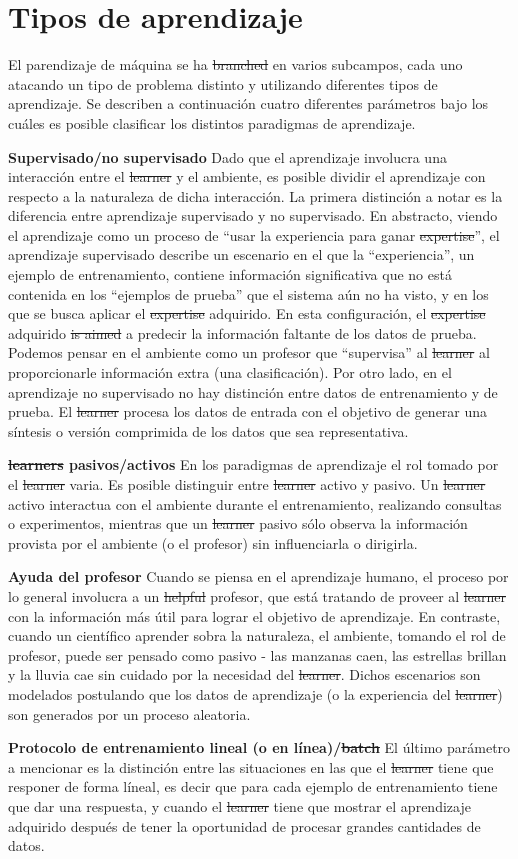\section{Tipos de aprendizaje}
El parendizaje de máquina se ha \sout{branched} en varios subcampos,
cada uno atacando un tipo de problema distinto y utilizando diferentes
tipos de aprendizaje.
Se describen a continuación cuatro diferentes parámetros bajo los cuáles
es posible clasificar los distintos paradigmas de aprendizaje.

\textbf{Supervisado/no supervisado} Dado que el aprendizaje involucra
una interacción entre el \sout{learner} y el ambiente, es posible
dividir el aprendizaje con respecto a la naturaleza de dicha interacción.
La primera distinción a notar es la diferencia entre aprendizaje supervisado
y no supervisado. En abstracto, viendo el aprendizaje como un proceso
de ``usar la experiencia para ganar \sout{expertise}'', el aprendizaje
supervisado describe un escenario en el que la ``experiencia'', un
ejemplo de entrenamiento, contiene información significativa que no
está contenida en los ``ejemplos de prueba'' que el sistema aún no ha
visto, y en los que se busca aplicar el \sout{expertise} adquirido.
En esta configuración, el \sout{expertise} adquirido \sout{is aimed}
a predecir la información faltante de los datos de prueba. Podemos
pensar en el ambiente como un profesor que ``supervisa'' al \sout{learner}
al proporcionarle información extra (una clasificación). Por otro lado,
en el aprendizaje no supervisado no hay distinción entre datos de
entrenamiento y de prueba. El \sout{learner} procesa los datos de entrada
con el objetivo de generar una síntesis o versión comprimida de los
datos que sea representativa.

\textbf{\sout{learners} pasivos/activos} En los paradigmas de aprendizaje
el rol tomado por el \sout{learner} varia. Es posible distinguir entre
\sout{learner} activo y pasivo. Un \sout{learner} activo interactua
con el ambiente durante el entrenamiento, realizando consultas o
experimentos, mientras que un \sout{learner} pasivo sólo observa la
información provista por el ambiente (o el profesor) sin influenciarla
o dirigirla.

\textbf{Ayuda del profesor} Cuando se piensa en el aprendizaje humano,
el proceso por lo general involucra a un \sout{helpful} profesor, que
está tratando de proveer al \sout{learner} con la información más útil
para lograr el objetivo de aprendizaje. En contraste, cuando un científico
aprender sobra la naturaleza, el ambiente, tomando el rol de profesor,
puede ser pensado como pasivo - las manzanas caen, las estrellas
brillan y la lluvia cae sin cuidado por la necesidad del \sout{learner}.
Dichos escenarios son modelados postulando que los datos de aprendizaje
(o la experiencia del \sout{learner}) son generados por un proceso aleatoria.

\textbf{Protocolo de entrenamiento lineal (o en línea)/\sout{batch}} El
último parámetro a mencionar es la distinción entre las situaciones en
las que el \sout{learner} tiene que responer de forma líneal, es decir
que para cada ejemplo de entrenamiento tiene que dar una respuesta, y
cuando el \sout{learner} tiene que mostrar el aprendizaje adquirido
después de tener la oportunidad de procesar grandes cantidades de datos.
